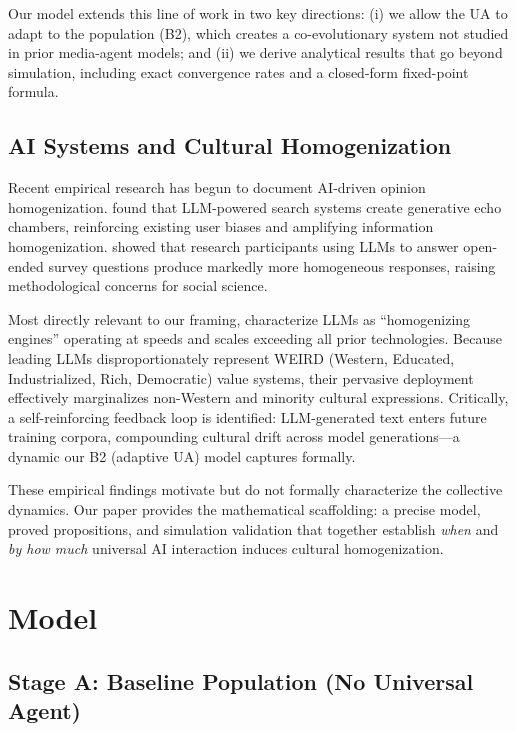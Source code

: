 \documentclass{article}
\theoremstyle{plain}
\theoremstyle{definition}
\theoremstyle{remark}
\begin{document}
Our model extends this line of work in two key directions: (i) we allow
the UA to adapt to the population (B2), which creates a co-evolutionary
system not studied in prior media-agent models; and (ii) we derive
analytical results that go beyond simulation, including exact convergence
rates and a closed-form fixed-point formula.

\subsection{AI Systems and Cultural Homogenization}

Recent empirical research has begun to document AI-driven opinion
homogenization. \citet{sharma2024} found that LLM-powered search systems
create generative echo chambers, reinforcing existing user biases and
amplifying information homogenization. \citet{zhang2025} showed that
research participants using LLMs to answer open-ended survey questions
produce markedly more homogeneous responses, raising methodological
concerns for social science.

Most directly relevant to our framing, \citet{daryani2026} characterize
LLMs as ``homogenizing engines'' operating at speeds and scales exceeding
all prior technologies. Because leading LLMs disproportionately represent
WEIRD (Western, Educated, Industrialized, Rich, Democratic) value systems,
their pervasive deployment effectively marginalizes non-Western and
minority cultural expressions. Critically, a self-reinforcing feedback
loop is identified: LLM-generated text enters future training corpora,
compounding cultural drift across model generations---a dynamic our B2
(adaptive UA) model captures formally.

These empirical findings motivate but do not formally characterize the
collective dynamics. Our paper provides the mathematical scaffolding:
a precise model, proved propositions, and simulation validation that
together establish \emph{when} and \emph{by how much} universal AI
interaction induces cultural homogenization.

\section{Model}
\label{sec:model}

\subsection{Stage A: Baseline Population (No Universal Agent)}
\end{document}
